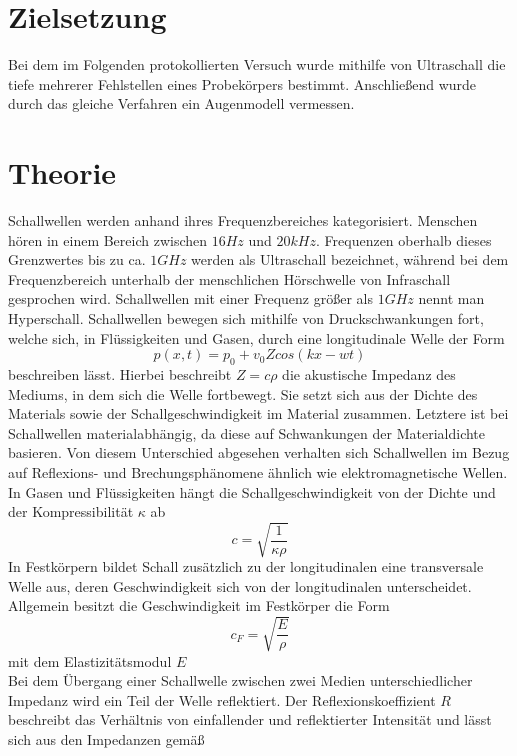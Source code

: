 \section{Zielsetzung}
Bei dem im Folgenden protokollierten Versuch wurde mithilfe von Ultraschall die tiefe mehrerer Fehlstellen eines Probekörpers bestimmt. Anschließend wurde durch das gleiche Verfahren ein Augenmodell vermessen. 
\section{Theorie}
\label{sec:theorie}
Schallwellen werden anhand ihres Frequenzbereiches kategorisiert. Menschen hören in einem Bereich zwischen $16Hz$ und $20 kHz$. Frequenzen oberhalb dieses Grenzwertes bis zu ca. $1 GHz$ werden als Ultraschall bezeichnet, während bei dem Frequenzbereich unterhalb der menschlichen Hörschwelle von Infraschall gesprochen wird. Schallwellen mit einer Frequenz größer als $1 GHz$ nennt man Hyperschall.  
Schallwellen bewegen sich mithilfe von Druckschwankungen fort, welche sich, in Flüssigkeiten und Gasen, durch eine longitudinale Welle der Form
\begin{equation}
p(x,t)=p_0+v_0Zcos(kx-wt)
\end{equation}
beschreiben lässt. Hierbei beschreibt $Z=c\rho$ die akustische Impedanz des Mediums, in dem sich die Welle fortbewegt. Sie setzt sich aus der Dichte des Materials sowie der Schallgeschwindigkeit im Material zusammen. Letztere ist bei Schallwellen materialabhängig, da diese auf Schwankungen der Materialdichte basieren. Von diesem Unterschied abgesehen verhalten sich Schallwellen im Bezug auf Reflexions- und Brechungsphänomene ähnlich wie elektromagnetische Wellen. 
In Gasen und Flüssigkeiten hängt die Schallgeschwindigkeit von der Dichte und der Kompressibilität $\kappa$ ab
\begin{equation}
c=\sqrt{\frac{1}{\kappa \rho}}
\end{equation}
In Festkörpern bildet Schall zusätzlich zu der longitudinalen eine transversale Welle aus, deren Geschwindigkeit sich von der longitudinalen unterscheidet. Allgemein besitzt die Geschwindigkeit im Festkörper die Form
\begin{equation}
c_F=\sqrt{\frac{E}{\rho}}
\end{equation}
mit dem Elastizitätsmodul $E$ \\
Bei dem Übergang einer Schallwelle zwischen zwei Medien unterschiedlicher Impedanz wird ein Teil der Welle reflektiert. Der Reflexionskoeffizient $R$ beschreibt das Verhältnis von einfallender und reflektierter Intensität und lässt sich aus den Impedanzen gemäß
